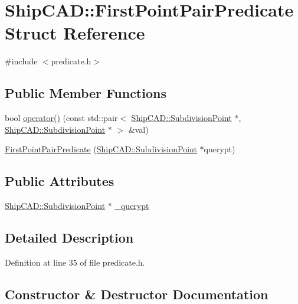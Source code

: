 \hypertarget{structShipCAD_1_1FirstPointPairPredicate}{}\section{Ship\+C\+AD\+:\+:First\+Point\+Pair\+Predicate Struct Reference}
\label{structShipCAD_1_1FirstPointPairPredicate}


{\ttfamily \#include $<$predicate.\+h$>$}

\subsection*{Public Member Functions}
\begin{DoxyCompactItemize}
\item 
bool \hyperlink{structShipCAD_1_1FirstPointPairPredicate_ab70aa6aaae8fe84bc3c6ea026d89480d}{operator()} (const std\+::pair$<$ \hyperlink{classShipCAD_1_1SubdivisionPoint}{Ship\+C\+A\+D\+::\+Subdivision\+Point} $\ast$, \hyperlink{classShipCAD_1_1SubdivisionPoint}{Ship\+C\+A\+D\+::\+Subdivision\+Point} $\ast$ $>$ \&val)
\item 
\hyperlink{structShipCAD_1_1FirstPointPairPredicate_a9b09d320bf5ebbe9fef5ec6df1da0e45}{First\+Point\+Pair\+Predicate} (\hyperlink{classShipCAD_1_1SubdivisionPoint}{Ship\+C\+A\+D\+::\+Subdivision\+Point} $\ast$querypt)
\end{DoxyCompactItemize}
\subsection*{Public Attributes}
\begin{DoxyCompactItemize}
\item 
\hyperlink{classShipCAD_1_1SubdivisionPoint}{Ship\+C\+A\+D\+::\+Subdivision\+Point} $\ast$ \hyperlink{structShipCAD_1_1FirstPointPairPredicate_ad0ddbf84638ac51733b015bffca85e5f}{\+\_\+querypt}
\end{DoxyCompactItemize}


\subsection{Detailed Description}


Definition at line 35 of file predicate.\+h.



\subsection{Constructor \& Destructor Documentation}
